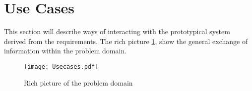 \section{Use Cases}\label{sub:usecases}

This section will describe ways of interacting with the prototypical system derived from the requirements. The rich picture \cref{fig:richpicture}, show the general exchange of information within the problem domain.

\begin{figure}
  \centering
  \begin{adjustbox}{max width=\textwidth}
    \texttt{[image: Usecases.pdf]}
  \end{adjustbox}
  \caption[Rich picture]{Rich picture of the problem domain}
  \label{fig:richpicture}
\end{figure}
